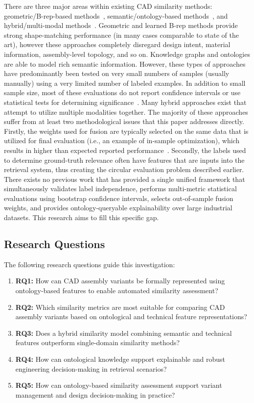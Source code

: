 \documentclass[preprint,12pt]{elsarticle}
\begin{document}
There are three major areas within existing CAD similarity methods: geometric/B-rep-based methods~\cite{Hou2023,LiCorney2023}, semantic/ontology-based methods~\cite{Gruber1993,Bharadwaj2022}, and hybrid/multi-modal methods~\cite{Quan2024}.
Geometric and learned B-rep methods provide strong shape-matching performance (in many cases comparable to state of the art), however these approaches completely disregard design intent, material information, assembly-level topology, and so on.
Knowledge graphs and ontologies are able to model rich semantic information.
However, these types of approaches have predominantly been tested on very small numbers of samples (usually manually) using a very limited number of labeled examples.
In addition to small sample size, most of these evaluations do not report confidence intervals or use statistical tests for determining significance~\cite{Pan2024}.
Many hybrid approaches exist that attempt to utilize multiple modalities together.
The majority of these approaches suffer from at least two methodological issues that this paper addresses directly.
Firstly, the weights used for fusion are typically selected on the same data that is utilized for final evaluation (i.e., an example of in-sample optimization), which results in higher than expected reported performance~\cite{Kapoor2023}.
Secondly, the labels used to determine ground-truth relevance often have features that are inputs into the retrieval system, thus creating the circular evaluation problem described earlier.
There exists no previous work that has provided a single unified framework that simultaneously validates label independence, performs multi-metric statistical evaluations using bootstrap confidence intervals, selects out-of-sample fusion weights, and provides ontology-queryable explainability over large industrial datasets.
This research aims to fill this specific gap.

\subsection{Research Questions}

The following research questions guide this investigation:
\begin{enumerate}
    \item \textbf{RQ1:} How can CAD assembly variants be formally represented using ontology-based features to enable automated similarity assessment?
    \item \textbf{RQ2:} Which similarity metrics are most suitable for comparing CAD assembly variants based on ontological and technical feature representations?
    \item \textbf{RQ3:} Does a hybrid similarity model combining semantic and technical features outperform single-domain similarity methods?
    \item \textbf{RQ4:} How can ontological knowledge support explainable and robust engineering decision-making in retrieval scenarios?
    \item \textbf{RQ5:} How can ontology-based similarity assessment support variant management and design decision-making in practice?
\end{enumerate}
\end{document}
